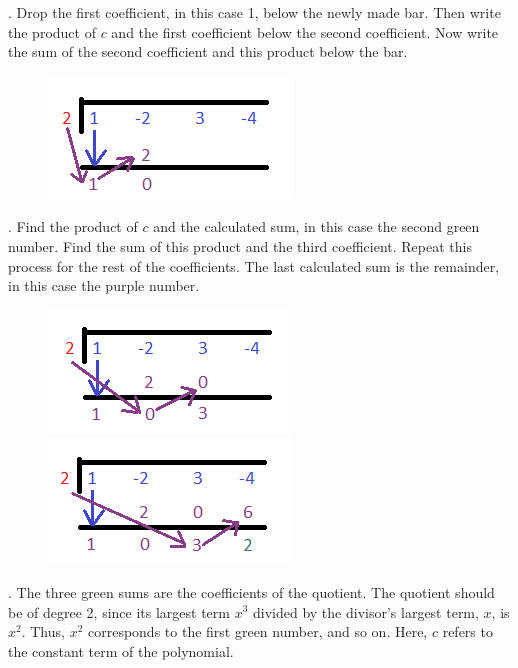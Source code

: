         . Drop the first coefficient, in this case 1, below the newly made bar. Then
        write the product of $c$ and the first coefficient below the second coefficient. Now
        write the sum of the second coefficient and this product below the bar. \\

        \begin{figure} [hbt!]
            \centering
            \includegraphics [scale = 0.5] {Resources/Unit3Polynomials/synthdiv3.png}
        \end{figure}

        . Find the product of $c$ and the calculated sum, in this case the second
        green number. Find the sum of this product and the third coefficient. Repeat this
        process for the rest of the coefficients. The last calculated sum is the remainder,
        in this case the purple number.

        \begin{figure} [hbt!]
            \centering
            \includegraphics [scale = 0.5] {Resources/Unit3Polynomials/synthdiv4.png}
            \includegraphics [scale = 0.5] {Resources/Unit3Polynomials/synthdiv5.png}
        \end{figure}

        . The three green sums are the coefficients of the quotient. The quotient
        should be of degree 2, since its largest term $x^3$ divided by the divisor's largest
        term, $x$, is $x^2$. Thus, $x^2$ corresponds to the first green number, and so on.
        Here, $c$ refers to the constant term of the polynomial.

